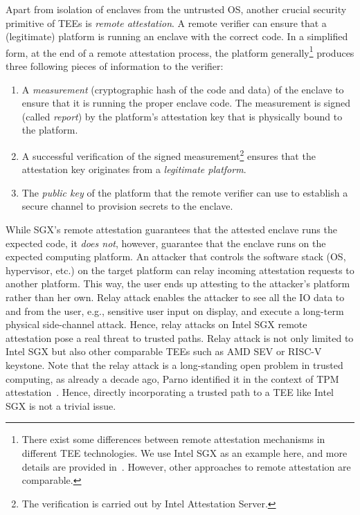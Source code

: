 Apart from isolation of enclaves from the untrusted OS, another crucial security primitive of TEEs is \emph{remote attestation}. A remote verifier can ensure that a (legitimate) platform is running an enclave with the correct code. In a simplified form, at the end of a remote attestation process, the platform generally\footnote{There exist some differences between remote attestation mechanisms in different TEE technologies. We use Intel SGX as an example here, and more details are provided in~. However, other approaches to remote attestation are comparable.} produces three following pieces of information to the verifier: 
\begin {enumerate}
\item A \emph{measurement} (cryptographic hash of the code and data) of the enclave to ensure that it is running the proper enclave code. The measurement is signed (called \emph{report}) by the platform's attestation key that is physically bound to the platform. 
\item A successful verification of the signed measurement\footnote{The verification is carried out by Intel Attestation Server.} ensures that the attestation key originates from a \emph{legitimate platform}.
\item The \emph{public key} of the platform that the remote verifier can use to establish a secure channel to provision secrets to the enclave.
\end{enumerate}

 While SGX's remote attestation guarantees that the attested enclave runs the expected code, it \emph{does not}, however, guarantee that the enclave runs on the expected computing platform. An attacker that controls the software stack (OS, hypervisor, etc.) on the target platform can relay incoming attestation requests to another platform. This way, the user ends up attesting to the attacker's platform rather than her own. Relay attack enables the attacker to see all the IO data to and from the user, e.g., sensitive user input on display, and execute a long-term physical side-channel attack. Hence, relay attacks on Intel SGX remote attestation pose a real threat to trusted paths. Relay attack is not only limited to Intel SGX but also other comparable TEEs such as AMD SEV or RISC-V keystone. Note that the relay attack is a long-standing open problem in trusted computing, as already a decade ago, Parno identified it in the context of TPM attestation~\cite{parno2008bootstrapping}. Hence, directly incorporating a trusted path to a TEE like Intel SGX is not a trivial issue.


